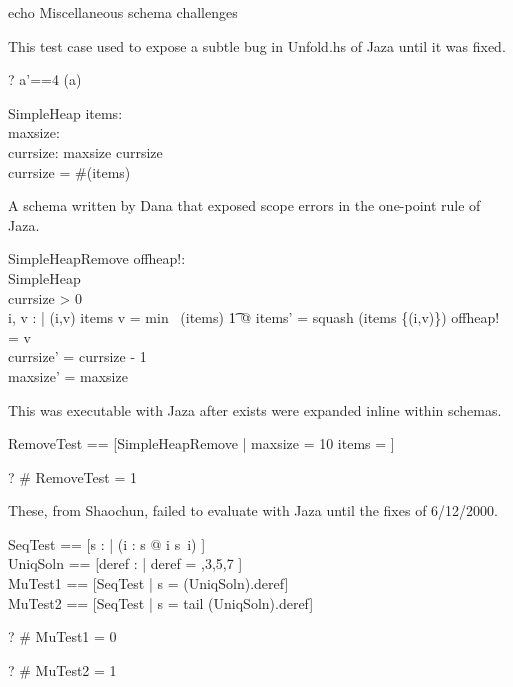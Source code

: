 \documentclass{article}
\begin{document}
echo Miscellaneous schema challenges


This test case used to expose a subtle bug in Unfold.hs of Jaza
until it was fixed.
\begin{zed} \vdash? \lblot a'==4 \rblot \in [Test1 | a=3] \hide(a) \end{zed}

\begin{schema}{SimpleHeap}
    items: \seq \nat \\
    maxsize: \nat \\
    currsize: \nat
\where
    maxsize \geq currsize \\
    currsize = \#(\ran items)
\end{schema}

A schema written by Dana that exposed scope errors in the one-point rule of Jaza.
\begin{schema}{SimpleHeapRemove}
    offheap!: \nat \\
    \Delta SimpleHeap \\
\where
    currsize > 0 \\
    \exists i, v : \nat | (i,v) \in items \land v = min~ (\ran items)
    \t1 @ items' = squash (items \setminus \{(i,v)\}) \land offheap! = v\\ 
    currsize' = currsize - 1 \\
    maxsize' = maxsize 
\end{schema}

This was executable with Jaza after exists were expanded inline within schemas.
\begin{zed}
  RemoveTest == [SimpleHeapRemove | maxsize = 10 \land items =  \rangle]
\end{zed}
\begin{zed} \vdash? \# RemoveTest = 1 \end{zed}


These, from Shaochun, failed to evaluate with Jaza until the fixes of 6/12/2000.
\begin{zed}
  SeqTest  == [s : \seq \nat | (\forall i : \dom s @ i \neq s~i) ] \\
  UniqSoln == [deref : \seq \nat | deref = ,3,5,7 \rangle] \\
  MuTest1  == [SeqTest | s = (\mu UniqSoln).deref] \\
  MuTest2  == [SeqTest | s = tail (\mu UniqSoln).deref]
\end{zed}
\begin{zed} \vdash? \# MuTest1 = 0 \end{zed}
\begin{zed} \vdash? \# MuTest2 = 1 \end{zed}
\end{document}
